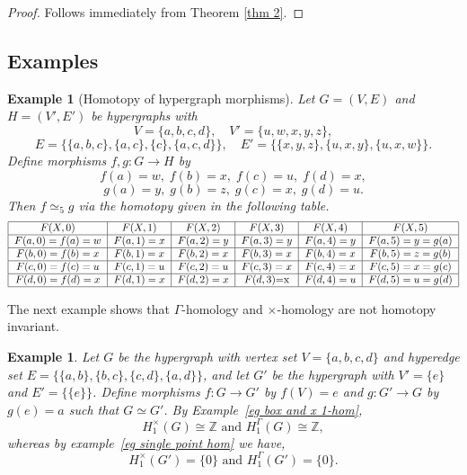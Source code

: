 \documentclass[11pt]{amsart}
\newtheorem{ex}[subsection]{Example}
\begin{document}
\begin{proof}
	Follows immediately from Theorem \ref{thm 2}.
\end{proof}


\subsection{Examples}

\begin{ex}[Homotopy of hypergraph morphisms]
Let $G=(V,E)$ and $H=(V',E')$ be hypergraphs with
\[
V=\{a,b,c,d\}, \quad V'=\{u,w,x,y,z\},
\]
\[
E=\{\{a,b,c\},\{a,c\},\{c\},\{a,c,d\}\}, \quad
E'=\{\{x,y,z\},\{u,x,y\},\{u,x,w\}\}.
\]
Define morphisms $f,g:G\to H$ by
\[
f(a)=w,\; f(b)=x,\; f(c)=u,\; f(d)=x,
\]
\[
g(a)=y,\; g(b)=z,\; g(c)=x,\; g(d)=u.
\]
Then $f\simeq_5 g$ via the homotopy given in the following table.
	{\fontsize{8.5pt}{10pt}\selectfont
    \[ \begin{tabular}{|c|c|c|c|c|c|}
		\hline
		$F(X,0)$& $F(X,1)$ & $F(X,2)$ & $F(X,3)$ & $F(X,4)$ & $F(X,5)$ \\
		\hline
		$F(a,0)=f(a)=w$&  $F(a,1)=x$ & $F(a,2)=y$& $F(a,3)= y$  & $F(a,4)= y$ &  $F(a,5)= y=g(a)$\\
		\hline
		$F(b,0)=f(b)=x$&  $F(b,1)=x$ & $F(b,2)=x$ & $F(b,3)=x$ & $F(b,4)=x $  & $F(b,5)= z=g(b)$ \\
		\hline
		$F(c,0)=f(c)=u$ & $F(c,1)=u$ & $F(c,2)=u$ & $F(c,3)=x$ & $F(c,4)= x$ & $F(c,5)=x=g(c)$ \\
		\hline
		$F(d,0)=f(d)=x$& $F(d,1)=x$ & $F(d,2)=x$ & $F(d,3)$=x & $F(d,4)=u$ & $F(d,5)=u=g(d)$ \\
		\hline
	\end{tabular}
	\]}

\end{ex}


The next example shows that $\Gamma$-homology and $\times$-homology are not homotopy invariant.
\\
\begin{ex}\label{eg not homotopy invariant}
Let $G$ be the hypergraph with vertex set $V=\{a,b,c,d\}$ and hyperedge set $E=\{\{a,b\},\{b,c\},\{c,d\},\{a,d\}\}$, and let $G'$ be the hypergraph with $V'=\{e\}$ and $E'=\{\{e\}\}$. Define morphisms $f:G\to G'$ by $f(V)=e$ and $g:G'\to G$ by $g(e)=a$ such that $G\simeq G'$. By Example~\ref{eg box and x 1-hom}, \[H_1^\times(G)\cong \mathbb{Z} \text{ and } H_1^\Gamma(G)\cong \mathbb{Z},\] whereas by example~\ref{eg single point hom} we have,
\[H_1^\times(G')=\{0\} \text{ and } H_1^\Gamma(G')=\{0\}.\]
\end{ex}
\end{document}
